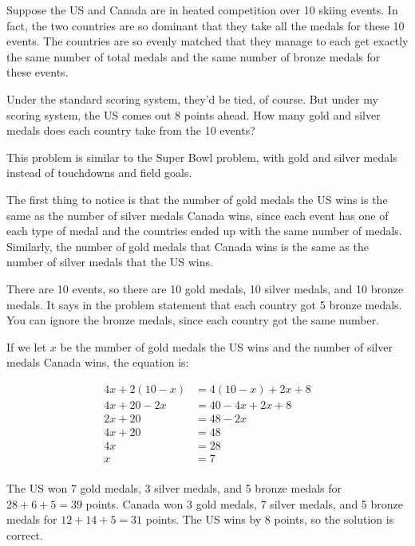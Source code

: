 \documentclass[letterpaper, landscape]{exam}
\begin{document}
\begin{questions}
      Suppose the US and Canada are in heated competition over 10 skiing events.
      In fact, the two countries are so dominant that they take all the medals
      for these 10 events.  The countries are so evenly matched that they manage
      to each get exactly the same number of total medals and the same number of
      bronze medals for these events.

      Under the standard scoring system, they'd be tied, of course.  But under my
      scoring system, the US comes out 8 points ahead.  How many gold and silver
      medals does each country take from the 10 events?

      \begin{solution}
        This problem is similar to the Super Bowl problem, with gold and silver
        medals instead of touchdowns and field goals.

        The first thing to notice is that the number of gold medals the US wins
        is the same as the number of silver medals Canada wins, since each event
        has one of each type of medal and the countries ended up with the same
        number of medals.  Similarly, the number of gold medals that Canada wins
        is the same as the number of silver medals that the US wins.

        There are 10 events, so there are 10 gold medals, 10 silver medals, and
        10 bronze medals.  It says in the problem statement that each country got
        5 bronze medals.  You can ignore the bronze medals, since each country
        got the same number. 

        If we let $x$ be the number of gold medals the US wins and the number of
        silver medals Canada wins, the equation is:

        \begin{align*}
          4x + 2(10 - x) & = 4(10 - x) + 2x + 8\\
          4x + 20 - 2x   & = 40 - 4x + 2x + 8\\
          2x + 20        & = 48 - 2x \\
          4x + 20        & = 48 \\
          4x             & = 28 \\
          x              & = 7 \\
        \end{align*}

        The US won 7 gold medals, 3 silver medals, and 5 bronze medals for $28
        + 6 + 5 = 39$ points.  Canada won 3 gold medals, 7 silver medals, and 5
        bronze medals for $12 + 14 + 5 = 31$ points.  The US wins by 8 points,
        so the solution is correct.


\end{solution}
\end{questions}
\end{document}
